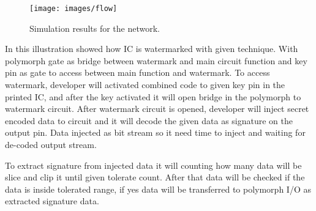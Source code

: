 \documentclass[10pt,journal,compsoc]{IEEEtran}
\begin{document}
\begin{figure}[h]
	\centering
	\texttt{[image: images/flow]}
	\caption{Simulation results for the network.}
	\label{fig_sim}
\end{figure}

In this illustration showed how IC is watermarked with given technique. With polymorph gate as bridge between watermark and main circuit function and key pin as gate to access between main function and watermark. To access watermark, developer will activated combined code to given key pin in the printed IC, and after the key activated it will open bridge in the polymorph to watermark circuit. After watermark circuit is opened, developer will inject secret encoded data to circuit and it will decode the given data as signature on the output pin. Data injected as bit stream so it need time to inject and waiting for de-coded output stream.

To extract signature from injected data it will counting how many data will be slice and clip it until given tolerate count. After that data will be checked if the data is inside tolerated range, if yes data will be transferred to polymorph I/O as extracted signature data.

\end{document}

